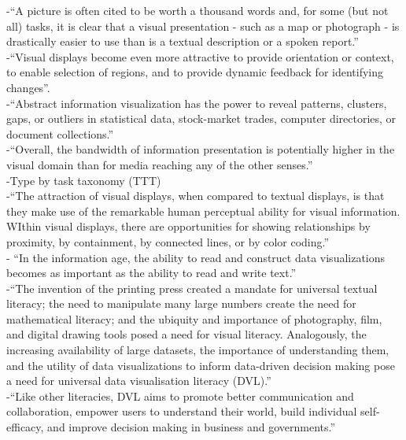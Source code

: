 -{\color{orange}“A picture is often cited to be worth a thousand words and, for some (but not all) tasks, it is clear that a visual presentation - such as a map or photograph - is drastically easier to use than is a textual description or a spoken report.”\cite{Shneiderman1996}}\\
-{\color{orange}“Visual displays become even more attractive to provide orientation or context, to enable selection of regions, and to provide dynamic feedback for identifying changes”.\cite{Shneiderman1996}}\\
-{\color{orange}“Abstract information visualization has the power to reveal patterns, clusters, gaps, or outliers in statistical data, stock-market trades, computer directories, or document collections.”\cite{Shneiderman1996}}\\
-{\color{orange}“Overall, the bandwidth of information presentation is potentially higher in the visual domain than for media reaching any of the other senses.”\cite{Shneiderman1996}}\\
-{\color{orange}Type by task taxonomy (TTT)\cite{Shneiderman1996}}\\
-{\color{orange}“The attraction of visual displays, when compared to textual displays, is that they make use of the remarkable human perceptual ability for visual information. WIthin visual displays, there are opportunities for showing relationships by proximity, by containment, by connected lines, or by color coding.”\cite{Shneiderman1996}}\\
-{\color{orange} “In the information age, the ability to read and construct data visualizations becomes as important as the ability to read and write text.”\cite{Borner2019}}\\
-{\color{orange}“The invention of the printing press created a mandate for universal textual literacy; the need to manipulate many large numbers create the need for mathematical literacy; and the ubiquity and importance of photography, film, and digital drawing tools posed a need for visual literacy. Analogously, the increasing availability of large datasets, the importance of understanding them, and the utility of data visualizations to inform data-driven decision making pose a need for universal data visualisation literacy (DVL).”
\cite{Borner2019}}\\
-{\color{orange}“Like other literacies, DVL aims to promote better communication and collaboration, empower users to understand their world, build individual self-efficacy, and improve decision making in business and governments.”\cite{Borner2019}}\\
